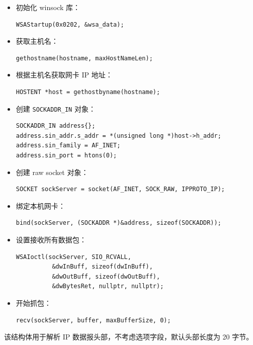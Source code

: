 \documentclass[UTF8,12pt,a4paper]{ctexart}
\begin{document}
\begin{itemize}
  \item 初始化 winsock 库：
\begin{lstlisting}
WSAStartup(0x0202, &wsa_data);
\end{lstlisting}

  \item 获取主机名：
\begin{lstlisting}
gethostname(hostname, maxHostNameLen);
\end{lstlisting}

  \item 根据主机名获取网卡 IP 地址：
\begin{lstlisting}
HOSTENT *host = gethostbyname(hostname);
\end{lstlisting}

  \item 创建 \texttt{SOCKADDR\_IN} 对象：
\begin{lstlisting}
SOCKADDR_IN address{};
address.sin_addr.s_addr = *(unsigned long *)host->h_addr;
address.sin_family = AF_INET;
address.sin_port = htons(0);
\end{lstlisting}

  \item 创建 raw socket 对象：
\begin{lstlisting}
SOCKET sockServer = socket(AF_INET, SOCK_RAW, IPPROTO_IP);
\end{lstlisting}

  \item 绑定本机网卡：
\begin{lstlisting}
bind(sockServer, (SOCKADDR *)&address, sizeof(SOCKADDR));
\end{lstlisting}

  \item 设置接收所有数据包：
\begin{lstlisting}
WSAIoctl(sockServer, SIO_RCVALL,
          &dwInBuff, sizeof(dwInBuff),
          &dwOutBuff, sizeof(dwOutBuff),
          &dwBytesRet, nullptr, nullptr);
\end{lstlisting}

  \item 开始抓包：
\begin{lstlisting}
recv(sockServer, buffer, maxBufferSize, 0);
\end{lstlisting}
\end{itemize}


该结构体用于解析 IP 数据报头部，不考虑选项字段，默认头部长度为 20 字节。
\end{document}
